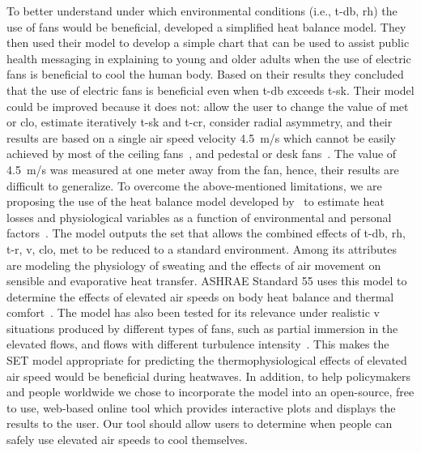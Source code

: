 To better understand under which environmental conditions (i.e., \ac{t-db}, \ac{rh}) the use of fans would be beneficial,  developed a simplified heat balance model.
They then used their model to develop a simple chart that can be used to assist public health messaging in explaining to young and older adults when the use of electric fans is beneficial to cool the human body.
Based on their results they concluded that the use of electric fans is beneficial even when \ac{t-db} exceeds \ac{t-sk}.
Their model could be improved because it does not: allow the user to change the value of \ac{met} or \ac{clo}, estimate iteratively \ac{t-sk} and \ac{t-cr}, consider radial asymmetry, and their results are based on a single air speed velocity 4.5~m/s which cannot be easily achieved by most of the ceiling fans~\cite{Raftery2019}, and pedestal or desk fans~\cite{Yang2015a}.
The value of 4.5~m/s was measured at one meter away from the fan, hence, their results are difficult to generalize.
To overcome the above-mentioned limitations, we are proposing the use of the heat balance model developed by~ to estimate heat losses and physiological variables as a function of environmental and personal factors~\cite{Gagge1986}.
The model outputs the \ac{set} that allows the combined effects of \ac{t-db}, \ac{rh}, \ac{t-r}, \ac{v}, \ac{clo}, \ac{met} to be reduced to a standard environment.
Among its attributes are modeling the physiology of sweating and the effects of air movement on sensible and evaporative heat transfer.
ASHRAE Standard 55 uses this model to determine the effects of elevated air speeds on body heat balance and thermal comfort~\cite{ashrae552017}.
The model has also been tested for its relevance under realistic \ac{v} situations produced by different types of fans, such as partial immersion in the elevated flows, and flows with different turbulence intensity~\cite{Huang2014}.
This makes the SET model appropriate for predicting the thermophysiological effects of elevated air speed would be beneficial during heatwaves.
In addition, to help policymakers and people worldwide we chose to incorporate the model into an open-source, free to use, web-based online tool which provides interactive plots and displays the results to the user.
Our tool should allow users to determine when people can safely use elevated air speeds to cool themselves.